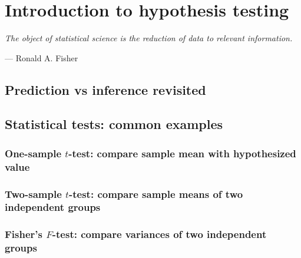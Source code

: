 \chapter{Introduction to hypothesis testing}
\label{chapter4}

\epigraph{\textit{The object of statistical science is the reduction of data to relevant information.}}{— Ronald A. Fisher}

\section{Prediction vs inference revisited}

\section{Statistical tests: common examples}

\subsection{One-sample \(t\)-test: compare sample mean with hypothesized value}

\subsection{Two-sample \(t\)-test: compare sample means of two independent groups}

\subsection{Fisher’s \(F\)-test: compare variances of two independent groups}

